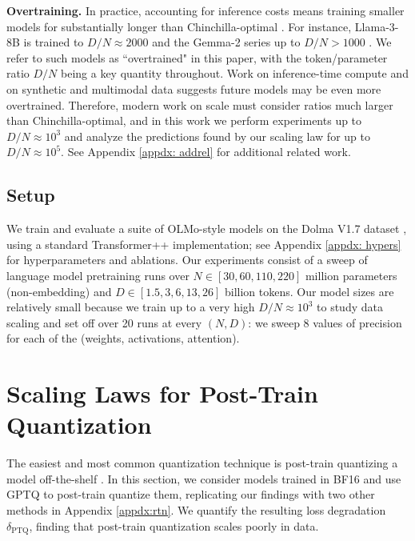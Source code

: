 \documentclass[11pt]{article}
\begin{document}
\textbf{Overtraining.} In practice, accounting for inference costs means training smaller models for substantially longer than Chinchilla-optimal \citep{sardana2023beyond, gadre2024language}. For instance, Llama-3-8B is trained to $D/N \approx 2000$ \citep{dubey2024llama} and the Gemma-2 series up to $D/N > 1000$ \citep{team2024gemma}. We refer to such models as ``overtrained" in this paper, with the token/parameter ratio $D/N$ being a key quantity throughout. Work on inference-time compute \citep{snell2024scaling, brown2024large} and on synthetic and multimodal data \citep{yang2024synthetic, fan2024scaling, bauer2024comprehensive} suggests future models may be even more overtrained. Therefore, modern work on scale must consider ratios much larger than Chinchilla-optimal, and in this work we perform experiments up to $D/N \approx 10^3$ and analyze the predictions found by our scaling law for up to $D/N \approx 10^5$. See Appendix \ref{appdx: addrel} for additional related work.

\subsection{Setup}

We train and evaluate a suite of OLMo-style models on the Dolma V1.7 dataset \citep{groeneveld2024olmo, soldaini2024dolma}, using a standard Transformer++ implementation; see Appendix \ref{appdx: hypers} for hyperparameters and ablations. Our experiments consist of a sweep of language model pretraining runs over $N \in [30, 60, 110, 220]$ million parameters (non-embedding) and $D \in [1.5, 3, 6, 13, 26]$ billion tokens. Our model sizes are relatively small because we train up to a very high $D/N \approx 10^3$ to study data scaling and set off over 20 runs at every $(N, D)$: we sweep 8 values of precision for each of the (weights, activations, attention). 


\section{Scaling Laws for Post-Train Quantization}
\label{section:ptq}

The easiest and most common quantization technique is post-train quantizing a model off-the-shelf \citep{chee2024quip, huang2024billm, dettmers2022gpt3, lin2023awq, xiao2023smoothquant}. In this section, we consider models trained in BF16 and use GPTQ \citep{frantar2022gptq} to post-train quantize them, replicating our findings with two other methods in Appendix \ref{appdx:rtn}. We quantify the resulting loss degradation $\delta_\text{PTQ}$, finding that post-train quantization scales poorly in data. 
\end{document}
